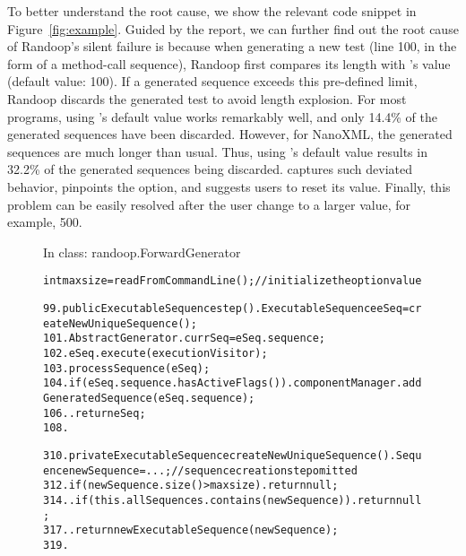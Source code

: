 To better understand the root cause, we show
the relevant code snippet in Figure~\ref{fig:example}.
Guided by the report, we can further find out
the root cause of Randoop's silent failure
is because when generating a new
test (line 100, in the form of a method-call sequence),
Randoop first compares its length with
's value (default value: 100). If a
generated sequence exceeds this pre-defined limit,
Randoop discards the generated test to avoid length explosion.
For most programs, using 's default value works remarkably
well, and only 14.4\% of the generated sequences have been discarded.
However, for NanoXML, the generated sequences are
much longer than usual. Thus, using 's default value
results in 32.2\% of the generated sequences being discarded.
\ourtool captures such deviated behavior, pinpoints the
 option, and suggests users to reset its value.
Finally, this problem can be easily resolved after
the user change  to a larger value, for example, 500.

\begin{figure}[t]
\vspace{-2mm}
{In class: randoop.ForwardGenerator}\\
\vspace{-4mm}
\begin{CodeOut}
\begin{alltt}
int maxsize = readFromCommandLine(); //{initialize the option value}

99.  public ExecutableSequence step() .   ExecutableSequence eSeq = createNewUniqueSequence();
101.   AbstractGenerator.currSeq = eSeq.sequence;
102.   eSeq.execute(executionVisitor);
103.   processSequence(eSeq);
104.   if (eSeq.sequence.hasActiveFlags()) .     componentManager.addGeneratedSequence(eSeq.sequence);
106.   .   return eSeq;
108. \ttrcb

310. private ExecutableSequence createNewUniqueSequence() .   Sequence newSequence = ...; //sequence creation step omitted
312.   if (newSequence.size() > maxsize) .     return null;
314.   .   if (this.allSequences.contains(newSequence)) .     return null;
317.   .   return new ExecutableSequence(newSequence);
319. \ttrcb
\end{alltt}
\end{CodeOut}
\tinystep
\vspace*{-3.0ex}  %
\end{figure}





